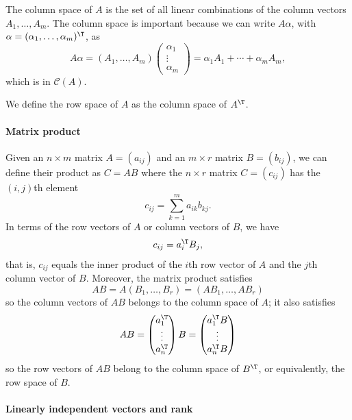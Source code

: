 The column space of $A$ is the set of all linear combinations of the column vectors  $A_{1},\ldots,A_{m}$.   The column space is important because  we can write $A\alpha$, with $\alpha = (\alpha_1, \ldots, \alpha_m)^{\T}$, as
$$
A\alpha = (A_{1},\ldots,A_{m}) \begin{pmatrix}
\alpha_1 \\
\vdots \\
\alpha_m
\end{pmatrix}
 = \alpha_{1}A_{1}+\cdots+\alpha_{m}A_{m}, 
$$
which is in $\mathcal{C}(A).$

We define the row space of $A$ as the column space of $A^{\T}$. 



\paragraph{Matrix product}

Given an $n\times m$ matrix $A = (a_{ij})$ and an $m\times r$ matrix $B = (b_{ij})$, we can define their product as $C = AB$ where the $n\times r$ matrix $C = (c_{ij})$ has the $(i, j)$th element
$$
c_{ij} = \sum_{k=1}^m a_{ik} b_{kj} .
$$
In terms of the row vectors of $A$ or column vectors of $B$, we have
$$
c_{ij} = a_i^{\T} B_j ,
$$
that is, $c_{ij}$ equals the inner product of the $i$th row vector of $A$ and the $j$th column vector of $B$. Moreover, the matrix product satisfies 
\begin{equation}\label{eq::matrix-product-1}
AB = A (B_1, \ldots, B_r) = (AB_1, \ldots, AB_r)
\end{equation}
so the column vectors of $AB$ belongs to the column space of $A$; it also satisfies 
\begin{equation}\label{eq::matrix-product-2}
AB = \begin{pmatrix}
a_1^{\T} \\
\vdots \\
a_n^{\T}
\end{pmatrix} B
= \begin{pmatrix}
a_1^{\T} B \\
\vdots \\
a_n^{\T} B
\end{pmatrix}
\end{equation}
so the row vectors of $AB$ belong to the column space of $B^{\T}$, or equivalently, the row space of $B$. 


\paragraph{Linearly independent vectors and rank}

